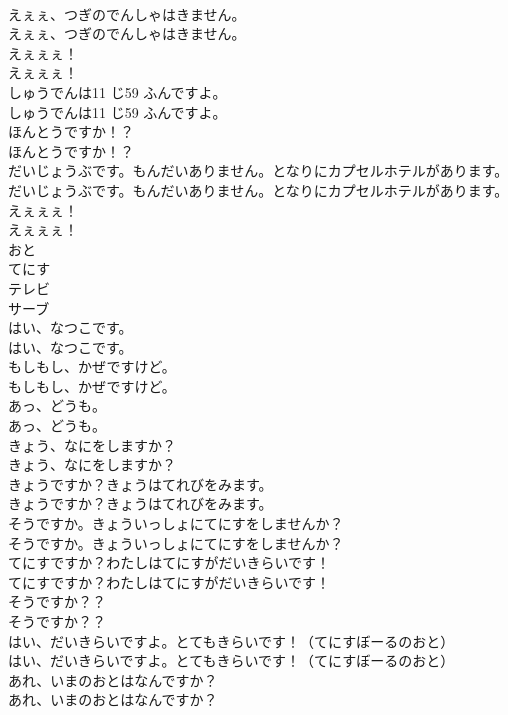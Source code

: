 \documentclass[8pt]{extreport}
\begin{document}
\begin{CJK}{UTF8}{min}
\\	えぇぇ、つぎのでんしゃはきません。	
\\	えぇぇ、つぎのでんしゃはきません。 
\\	えぇぇぇ！	
\\	えぇぇぇ！ 
\\	しゅうでんは11 じ59 ふんですよ。	
\\	しゅうでんは11 じ59 ふんですよ。 
\\	ほんとうですか！？	
\\	ほんとうですか！？ 
\\	だいじょうぶです。もんだいありません。となりにカプセルホテルがあります。	
\\	だいじょうぶです。もんだいありません。となりにカプセルホテルがあります。 
\\	えぇぇぇ！	
\\	えぇぇぇ！ 
\\	おと
\\	てにす
\\	テレビ
\\	サーブ
\\	はい、なつこです。	
\\	はい、なつこです。 
\\	もしもし、かぜですけど。	
\\	もしもし、かぜですけど。 
\\	あっ、どうも。	
\\	あっ、どうも。 
\\	きょう、なにをしますか？	
\\	きょう、なにをしますか？ 
\\	きょうですか？きょうはてれびをみます。	
\\	きょうですか？きょうはてれびをみます。 
\\	そうですか。きょういっしょにてにすをしませんか？	
\\	そうですか。きょういっしょにてにすをしませんか？ 
\\	てにすですか？わたしはてにすがだいきらいです！	
\\	てにすですか？わたしはてにすがだいきらいです！ 
\\	そうですか？？	
\\	そうですか？？ 
\\	はい、だいきらいですよ。とてもきらいです！（てにすぼーるのおと）	
\\	はい、だいきらいですよ。とてもきらいです！（てにすぼーるのおと） 
\\	あれ、いまのおとはなんですか？	
\\	あれ、いまのおとはなんですか？ 

\end{CJK}
\end{document}
